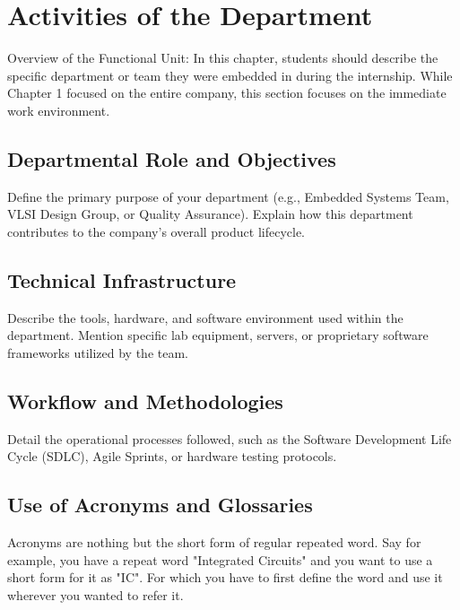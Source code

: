 \chapter{Activities of the Department}

Overview of the Functional Unit: In this chapter, students should describe the specific department or team they were embedded in during the internship. While Chapter 1 focused on the entire company, this section focuses on the immediate work environment.

\section{Departmental Role and Objectives}
Define the primary purpose of your department (e.g., Embedded Systems Team, VLSI Design Group, or Quality Assurance). Explain how this department contributes to the company's overall product lifecycle.

\section{Technical Infrastructure} 
Describe the tools, hardware, and software environment used within the department. Mention specific lab equipment, servers, or proprietary software frameworks utilized by the team.

\section{Workflow and Methodologies} 
Detail the operational processes followed, such as the Software Development Life Cycle (SDLC), Agile Sprints, or hardware testing protocols.

\section{Use of Acronyms and Glossaries}
Acronyms are nothing but the short form of regular repeated word. Say for example, you have a repeat word "Integrated Circuits" and you want to use a short form for it as "IC". For which you have to first define the word and use it wherever you wanted to refer it.


